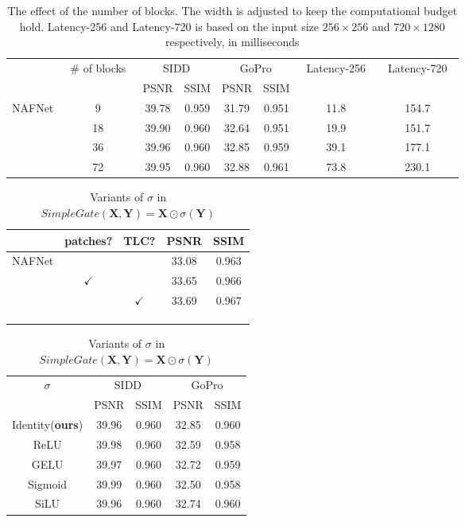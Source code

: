 \documentclass[runningheads]{llncs}
\begin{document}
\begin{table}
\begin{center}
\caption{The effect of the number of blocks. The width is adjusted to keep the computational budget hold. Latency-256 and Latency-720 is based on the input size $256\times256$ and $720\times1280$ respectively, in milliseconds}
\label{tab:ablation-num_of_blk}
\begin{tabular}{c|c|cc|cc|c|c}
\hline
 & \multirow{2}{*}{\ \# of blocks\ } &  \multicolumn{2}{|c|}{SIDD} & \multicolumn{2}{|c|}{GoPro} & \multirow{2}{*}{\ Latency-256\ } &\multirow{2}{*}{\ Latency-720\ }\\
  & & PSNR & SSIM & PSNR & SSIM &&\\
  \hline
\multirow{4}{*}{NAFNet} & 9 & 39.78 & 0.959 & 31.79 & 0.951 & 11.8 &154.7  \\
 & 18 & 39.90 & 0.960 & 32.64 & 0.951 & 19.9 &151.7  \\
 & 36  & 39.96 & 0.960 & 32.85 & 0.959 &39.1 &177.1  \\
 & 72 & 39.95 & 0.960 & 32.88 & 0.961 &73.8 &230.1  \\
 \hline
\end{tabular}
\end{center}
\end{table}
\begin{table}[ht]
\RawFloats
\scriptsize
\setlength{\tabcolsep}{3pt}
    \parbox{.4\linewidth}{
\centering
\caption{Effectiveness of TLC\cite{chu2021revisiting} on GoPro\cite{nah2017deep}
}
 \label{tab:ablation-tlc}
    \begin{tabular}{lcccc}

\hline
 &{patches?} & {TLC?}  & {PSNR} & {SSIM} \\ 
\hline
\multirow{3}{*}{NAFNet}& & & 33.08 &0.963\\
& $\checkmark$& & 33.65 &0.966\\
& & $\checkmark$& 33.69 &0.967\\
\hline
& & & &\\
& & & &\\
& & & &\\
\end{tabular}}
\hfill    
\parbox{.58\linewidth}{
\centering
\caption{Variants of $\sigma$ in $SimpleGate(\mathbf{X},\mathbf{Y})=\mathbf{X} \odot \sigma(\mathbf{Y})$}
 \label{tab:ablation-variants_sigma}

\begin{tabular}{c|cc|cc}
\hline
  \multirow{2}{*}{$\sigma$} &  \multicolumn{2}{|c|}{SIDD} & \multicolumn{2}{|c}{GoPro} \\
   & PSNR & SSIM & PSNR & SSIM \\
  \hline
 Identity(\textbf{ours}) & 39.96 & 0.960 & 32.85 & 0.960\\
  ReLU & 39.98 & 0.960 & 32.59 & 0.958  \\
  GELU  & 39.97 & 0.960 & 32.72 & 0.959   \\
  Sigmoid & 39.99 & 0.960 & 32.50 & 0.958   \\
  SiLU & 39.96 & 0.960 & 32.74 & 0.960   \\
 \hline
\end{tabular}
}
\end{table}
\end{document}
